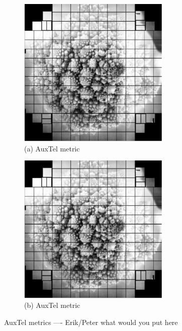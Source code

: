 \begin{figure}[!ht]
\begin{subfigure}{.5\textwidth}
    \centering
    \includegraphics[width=0.8\textwidth]{figures/rubin_romanesco}
     \caption[\small]{(a) AuxTel metric }
\end{subfigure}%
\begin{subfigure}{.5\textwidth} 
    \centering
    \includegraphics[width=0.8\textwidth]{figures/rubin_romanesco}
    \caption[\small]{(b) AuxTel metric}
\end{subfigure}
\par\medskip %
\caption[short]{\color{red}AuxTel metrics ---- Erik/Peter what would you put here}
\label{fig:faro_auxtel_metrics}
\end{figure}

